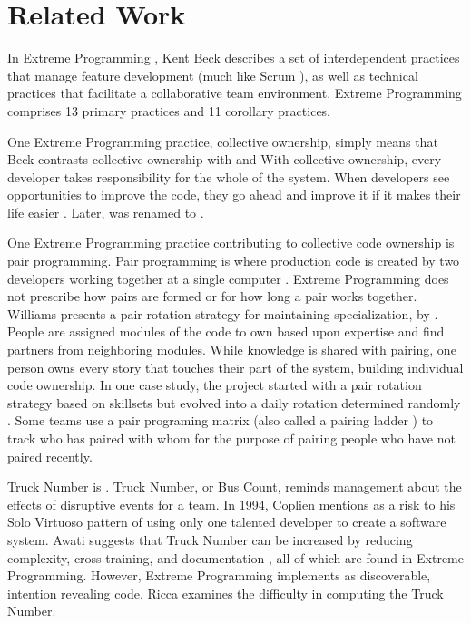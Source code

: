 \section{Related Work}
\label{RelatedWork}
In Extreme Programming \cite{BeckExtremeProgramming2004}, Kent Beck describes a set of interdependent practices that manage feature development (much like Scrum \cite{SchwaberScrum}), as well as technical practices that facilitate a collaborative team environment. Extreme Programming comprises 13 primary practices and 11 corollary practices. 

One Extreme Programming practice, collective ownership, simply means that  Beck contrasts collective ownership with  and  With collective ownership, every developer takes responsibility for the whole of the system. When developers see opportunities to improve the code, they go ahead and improve it if it makes their life easier \cite{BeckExtremeProgramming1999}. Later,  was renamed to  \cite{BeckExtremeProgramming2004}. 

One Extreme Programming practice contributing to collective code ownership is pair programming. Pair programming is where production code is created by two developers working together at a single computer \cite{BeckExtremeProgramming2004}. Extreme Programming does not prescribe how pairs are formed or for how long a pair works together. Williams presents a pair rotation strategy for maintaining specialization, by   \cite{Williams2002}. People are assigned modules of the code to own based upon expertise and find partners from neighboring modules. While knowledge is shared with pairing, one person owns every story that touches their part of the system, building individual code ownership. In one case study, the project started with a pair rotation strategy based on skillsets but evolved into a daily rotation determined randomly \cite{Vanhanen2007}. Some teams use a pair programing matrix \cite{AlaverdyanPairProgrammingMatrix} (also called a pairing ladder \cite{Davies2009AgileCoaching}) to track who has paired with whom for the purpose of pairing people who have not paired recently.

Truck Number is  \cite{WikiTruckNumber}. Truck Number, or Bus Count, reminds management about the effects of disruptive events for a team. In 1994, Coplien \cite{Coplien1994} mentions  as a risk to his Solo Virtuoso pattern of using only one talented developer to create a software system. Awati suggests that Truck Number can be increased by reducing complexity, cross-training, and documentation \cite{AwatiBusFactor}, all of which are found in Extreme Programming. However, Extreme Programming implements  as discoverable, intention revealing code. Ricca \cite{Ricca2011TruckFactor} examines the difficulty in computing the Truck Number. 

